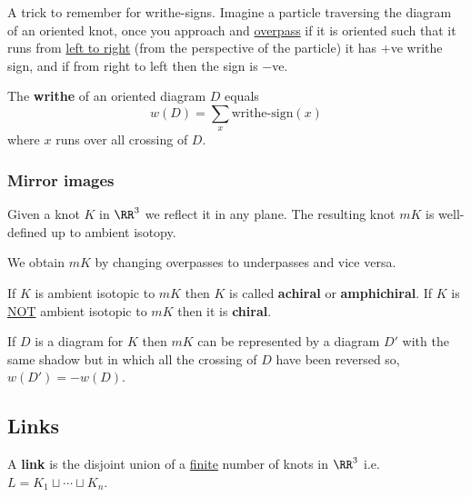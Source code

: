 \documentclass[12pt, a4paper]{article}
\begin{document}
\begin{mdnote}
    A trick to remember for writhe-signs. Imagine a particle traversing the diagram of an oriented knot, once you approach and \underline{overpass} if it is oriented such that it runs from \underline{left to right} (from the perspective of the particle) it has \(+\)ve writhe sign, and if from right to left then the sign is \(-\)ve. 
\end{mdnote}

\begin{definition}
    The \textbf{writhe} of an oriented diagram \(D\) equals
    \[w(D) = \sum_x \text{writhe-sign}(x)\]
    where \(x\) runs over all crossing of \(D\).
\end{definition}

\subsubsection{Mirror images}

\begin{definition}
    Given a knot \(K\) in \(\RR^3\) we reflect it in any plane. The resulting knot \(mK\) is well-defined up to ambient isotopy.
\end{definition}

\begin{mdnote}
    We obtain \(mK\) by changing overpasses to underpasses and vice versa. 
\end{mdnote}

\begin{definition}
    If \(K\) is ambient isotopic to \(mK\) then \(K\) is called \textbf{achiral} or \textbf{amphichiral}. If \(K\) is \underline{NOT} ambient isotopic to \(mK\) then it is \textbf{chiral}.
\end{definition}

\begin{mdprop}
    If \(D\) is a diagram for \(K\) then \(mK\) can be represented by a diagram \(D'\) with the same shadow but in which all the crossing of \(D\) have been reversed so, \(w(D')=-w(D)\).
\end{mdprop}

\subsection{Links}

\begin{definition}
    A \textbf{link} is the disjoint union of a \underline{finite} number of knots in \(\RR^3\) i.e. \(L = K_1 \sqcup \cdots \sqcup K_n\).
\end{definition}
\end{document}
